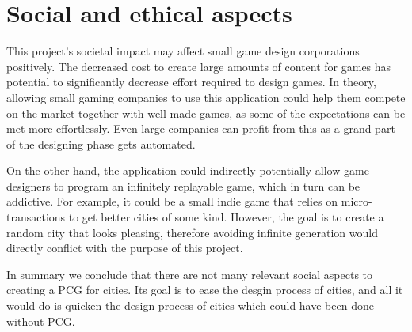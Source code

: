 \section{Social and ethical aspects}
This project's societal impact may affect small game design corporations positively.
The decreased cost to create large amounts of content for games has potential to significantly decrease effort required to design games. In theory, allowing small gaming companies to use this application could help them compete on the market together with well-made games, as some of the expectations can be met more effortlessly. Even large companies can profit from this as a grand part of the designing phase gets automated.

On the other hand, the application could indirectly potentially allow game designers to program an infinitely replayable game, which in turn can be addictive. For example, it could be a small indie game that relies on micro-transactions to get better cities of some kind. However, the goal is to create a random city that looks pleasing, therefore avoiding infinite generation would directly conflict with the purpose of this project.

In summary we conclude that there are not many relevant social aspects to creating a PCG for cities. Its goal is to ease the desgin process of cities, and all it would do is quicken the design process of cities which could have been done without PCG. 